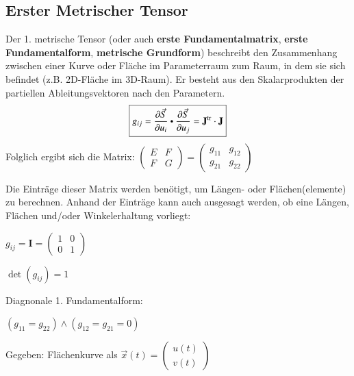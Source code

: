 \subsection{Erster Metrischer Tensor} %
Der 1. metrische Tensor (oder auch \textbf{erste Fundamentalmatrix}, \textbf{erste Fundamentalform}, \textbf{metrische Grundform})
beschreibt den Zusammenhang zwischen einer Kurve oder Fläche im Parameterraum zum Raum, in dem sie sich befindet (z.B. 2D-Fläche im 3D-Raum).
Er besteht aus den Skalarprodukten der partiellen Ableitungsvektoren nach den Parametern.
\[
    \boxed{g_{ij} = \frac{\partial \vec{S}}{\partial u_i} \dotp \frac{\partial \vec{S}}{\partial u_j} = \mathbf{J}^{\tr} \cdot \mathbf{J}}
\]
Folglich ergibt sich die Matrix: $\begin{pmatrix}
    E & F\\
    F & G
\end{pmatrix} = \begin{pmatrix}
    g_{11} & g_{12}\\
    g_{21} & g_{22}
\end{pmatrix}$

Die Einträge dieser Matrix werden benötigt, um Längen- oder Flächen(elemente) zu berechnen.
Anhand der Einträge kann auch ausgesagt werden, ob eine Längen, Flächen und/oder Winkelerhaltung vorliegt:

\begin{minipage}[t]{0.33\columnwidth}
    \centering

    \medskip
    $g_{ij} = \bm{I} = \begin{pmatrix}
        1 & 0 \\
        0 & 1 
    \end{pmatrix}$
\end{minipage}
\begin{minipage}[t]{.33\columnwidth}
    \centering

    \medskip
    $\det (g_{ij}) = 1$
\end{minipage}\hfill
\begin{minipage}[t]{.33\columnwidth}
    \centering

    \medskip
    Diagnonale 1. Fundamentalform:
    
    $(g_{11} = g_{22}) \land (g_{12} = g_{21} = 0)$
\end{minipage}


Gegeben: Flächenkurve als $\vec{x}(t) = \begin{pmatrix}
    u(t)\\
    v(t)
\end{pmatrix}$

